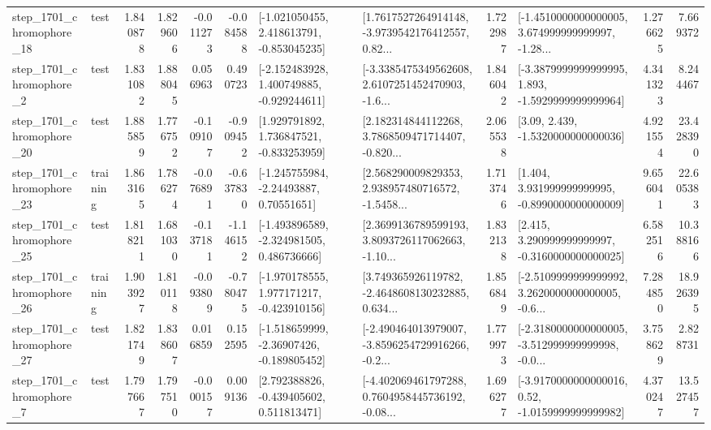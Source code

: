 \begin{tabular}{llrrrrllrlrr}
 step\_1701\_chromophore\_18 &      test &      1.840878 &    1.829606 &     -0.011273 & -0.084588 &   [-1.021050455, 2.418613791, -0.853045235] &  [1.7617527264914148, -3.9739542176412557, 0.82... &       1.722987 &  [-1.4510000000000005, 3.674999999999997, -1.28... &            1.276625 &          7.669372 \\
  step\_1701\_chromophore\_2 &      test &      1.831082 &    1.888045 &      0.056963 &  0.490723 &   [-2.152483928, 1.400749885, -0.929244611] &  [-3.3385475349562608, 2.6107251452470903, -1.6... &       1.846042 &  [-3.3879999999999995, 1.893, -1.5929999999999964] &            4.341323 &          8.244467 \\
 step\_1701\_chromophore\_20 &      test &      1.885859 &    1.776752 &     -0.109107 & -0.909452 &    [1.929791892, 1.736847521, -0.833253959] &  [2.182314844112268, 3.7868509471714407, -0.820... &       2.065538 &                 [3.09, 2.439, -1.5320000000000036] &            4.921554 &         23.428390 \\
 step\_1701\_chromophore\_23 &  training &      1.863165 &    1.786274 &     -0.076891 & -0.637830 &     [-1.245755984, -2.24493887, 0.70551651] &  [2.568290009829353, 2.938957480716572, -1.5458... &       1.713746 &    [1.404, 3.931999999999995, -0.8990000000000009] &            9.656041 &         22.605383 \\
 step\_1701\_chromophore\_25 &      test &      1.818211 &    1.681030 &     -0.137181 & -1.146152 &   [-1.493896589, -2.324981505, 0.486736666] &  [2.3699136789599193, 3.8093726117062663, -1.10... &       1.832138 &    [2.415, 3.290999999999997, -0.3160000000000025] &            6.582516 &         10.388166 \\
 step\_1701\_chromophore\_26 &  training &      1.903927 &    1.810118 &     -0.093809 & -0.780475 &   [-1.970178555, 1.977171217, -0.423910156] &  [3.749365926119782, -2.4648608130232885, 0.634... &       1.856849 &  [-2.5109999999999992, 3.2620000000000005, -0.6... &            7.284850 &         18.926395 \\
 step\_1701\_chromophore\_27 &      test &      1.821749 &    1.838607 &      0.016859 &  0.152595 &   [-1.518659999, -2.36907426, -0.189805452] &  [-2.490464013979007, -3.8596254729916266, -0.2... &       1.779973 &  [-2.3180000000000005, -3.512999999999998, -0.0... &            3.758629 &          2.828731 \\
  step\_1701\_chromophore\_7 &      test &      1.797667 &    1.797510 &     -0.000157 &  0.009136 &    [2.792388826, -0.439405602, 0.511813471] &  [-4.402069461797288, 0.7604958445736192, -0.08... &       1.696277 &   [-3.9170000000000016, 0.52, -1.0159999999999982] &            4.370247 &         13.527457 \\

\end{tabular}
